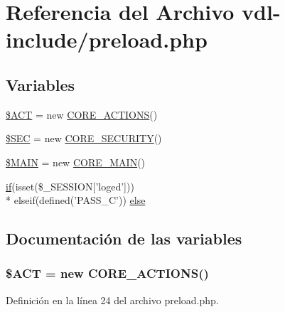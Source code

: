 \hypertarget{vdl-include_2preload_8php}{\section{Referencia del Archivo vdl-\/include/preload.php}
\label{vdl-include_2preload_8php}
}
\subsection*{Variables}
\begin{DoxyCompactItemize}
\item 
\hyperlink{vdl-include_2preload_8php_acccd6054a25e75994d89dd0d42dab8fc}{\$\-A\-C\-T} = new \hyperlink{classCORE__ACTIONS}{C\-O\-R\-E\-\_\-\-A\-C\-T\-I\-O\-N\-S}()
\item 
\hyperlink{vdl-include_2preload_8php_a68aa4f40df62985576ba2fc584690b9f}{\$\-S\-E\-C} = new \hyperlink{classCORE__SECURITY}{C\-O\-R\-E\-\_\-\-S\-E\-C\-U\-R\-I\-T\-Y}()
\item 
\hyperlink{vdl-include_2preload_8php_aa3efd4a61925b50d9d066bd2b42dcd3d}{\$\-M\-A\-I\-N} = new \hyperlink{classCORE__MAIN}{C\-O\-R\-E\-\_\-\-M\-A\-I\-N}()
\item 
\hyperlink{index_8php_a03ed0eadab502a2cb754ef4963570e97}{if}(isset(\$\-\_\-\-S\-E\-S\-S\-I\-O\-N\mbox{[}'loged'\mbox{]})) \\*
elseif(defined('P\-A\-S\-S\-\_\-\-C')) \hyperlink{vdl-include_2preload_8php_a967a80b79092a542d821aaf910a5ea83}{else}
\end{DoxyCompactItemize}


\subsection{Documentación de las variables}
\hypertarget{vdl-include_2preload_8php_acccd6054a25e75994d89dd0d42dab8fc}{
\subsubsection[{\$\-A\-C\-T}]{\setlength{\rightskip}{0pt plus 5cm}\$A\-C\-T = new {\bf C\-O\-R\-E\-\_\-\-A\-C\-T\-I\-O\-N\-S}()}}\label{vdl-include_2preload_8php_acccd6054a25e75994d89dd0d42dab8fc}


Definición en la línea 24 del archivo preload.\-php.


